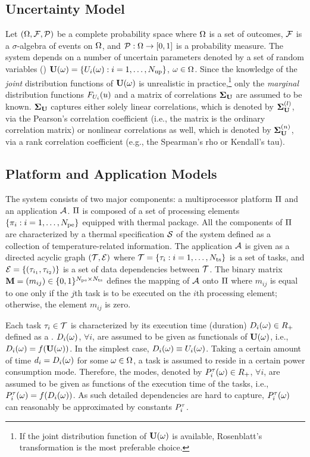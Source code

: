 \subsection{Uncertainty Model} 
Let $(\Omega, \mathcal{F}, \mathcal{P})$ be a complete probability space where $\Omega$ is a set of outcomes, $\mathcal{F}$ is a $\sigma$-algebra of events on $\Omega$, and $\mathcal{P}: \Omega \to [0, 1]$ is a probability measure. The system depends on a number of uncertain parameters denoted by a set of random variables (\rvs) $\mathbf{U}(\omega) = \{ U_i(\omega): i = 1, \dots, {N_\text{up}} \}$, $\omega \in \Omega$. Since the knowledge of the \emph{joint} distribution functions of $\mathbf{U}(\omega)$ is unrealistic in practice,\footnote{If the joint distribution function of $\mathbf{U}(\omega)$ is available, Rosenblatt's transformation is the most preferable choice.} only the \emph{marginal} distribution functions $F_{U_i}(u)$ and a matrix of correlations $\mathbf{\Sigma}_{\mathbf{U}}$ are assumed to be known. $\mathbf{\Sigma}_{\mathbf{U}}$ captures either solely linear correlations, which is denoted by $\mathbf{\Sigma}^{(l)}_{\mathbf{U}}$, via the Pearson's correlation coefficient (i.e., the matrix is the ordinary correlation matrix) or nonlinear correlations as well, which is denoted by $\mathbf{\Sigma}^{(n)}_{\mathbf{U}}$, via a rank correlation coefficient (e.g., the Spearman's rho or Kendall's tau).

\subsection{Platform and Application Models}  
The system consists of two major components: a multiprocessor platform $\Pi$ and an application $\mathcal{A}$. $\Pi$ is composed of a set of processing elements $\{ \pi_i: i = 1, \dots, {N_\text{pe}} \}$ equipped with thermal package. All the components of $\Pi$ are characterized by a thermal specification $\mathcal{S}$ of the system defined as a collection of temperature-related information. The application $\mathcal{A}$ is given as a directed acyclic graph $(\mathcal{T}, \mathcal{E})$ where $\mathcal{T} = \{ \tau_i: i = 1, \dots, {N_\text{ts}} \}$ is a set of tasks, and $\mathcal{E} = \{ (\tau_{i_1}, \tau_{i_2}) \}$ is a set of data dependencies between $\mathcal{T}$. The binary matrix $\mathbf{M} = (m_{ij}) \in \{ 0, 1 \}^{{N_\text{pe}} \times {N_\text{ts}}}$ defines the mapping of $\mathcal{A}$ onto $\Pi$ where $m_{ij}$ is equal to one only if the $j$th task is to be executed on the $i$th processing element; otherwise, the element $m_{ij}$ is zero.

Each task $\tau_i \in \mathcal{T}$ is characterized by its execution time (duration) $D_i(\omega) \in R_+$ defined as a \rv. $D_i(\omega)$, $\forall i$, are assumed to be given as functionals of $\mathbf{U}(\omega)$, i.e., $D_i(\omega) = f(\mathbf{U}(\omega))$. In the simplest case, $D_i(\omega) \equiv U_i(\omega)$. Taking a certain amount of time $d_i = D_i(\omega)$ for some $\omega \in \Omega$, a task is assumed to reside in a certain power consumption mode. Therefore, the modes, denoted by $P^\tau_i(\omega) \in R_+$, $\forall i$, are assumed to be given as functions of the execution time of the tasks, i.e., $P^\tau_i(\omega) = f(D_i(\omega))$. As such detailed dependencies are hard to capture, $P^\tau_i(\omega)$ can reasonably be approximated by constants $P^\tau_i$.

